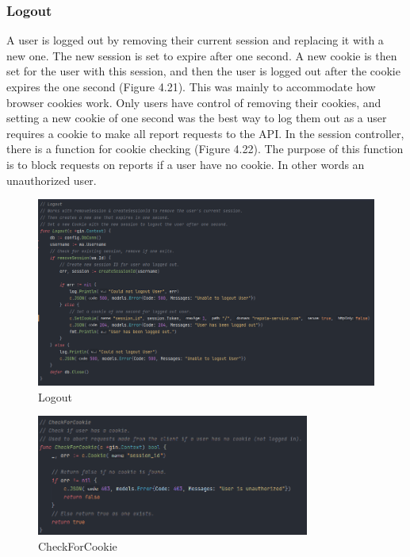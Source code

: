 \subsubsection{Logout}
A user is logged out by removing their current session and replacing it with a new one. The new session is set to expire after one second. A new cookie is then set for the user with this session, and then the user is logged out after the cookie expires the one second (Figure 4.21). This was mainly to accommodate how browser cookies work. Only users have control of removing their cookies, and setting a new cookie of one second was the best way to log them out as a user requires a cookie to make all report requests to the API. In the session controller, there is a function for cookie checking (Figure 4.22). The purpose of this function is to block requests on reports if a user have no cookie. In other words an unauthorized user.

\begin{figure}[H]
    \caption{Logout}
    \label{image:logout}
    \centering
    \includegraphics[width=1.0\textwidth]{images/horton/account_system/logout_func.png}
\end{figure}

\begin{figure}[H]
    \caption{CheckForCookie}
    \label{image:cookieCheck}
    \centering
    \includegraphics[width=0.8\textwidth]{images/horton/account_system/check_cookie.png}
\end{figure}

